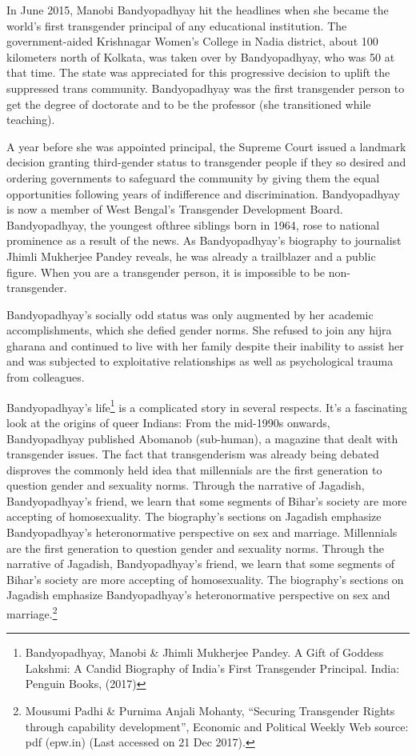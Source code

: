 \begin{multicols}{2}
\noi
In June 2015, Manobi Bandyopadhyay hit the headlines when she became the world's first
transgender principal of any educational institution. The government-aided Krishnagar
Women's College in Nadia district, about 100 kilometers north of Kolkata, was taken over by
Bandyopadhyay, who was 50 at that time. The state was appreciated for this progressive
decision to uplift the suppressed trans community. Bandyopadhyay was the first transgender
person to get the degree of doctorate and to be the professor (she transitioned while teaching).


\noi
A year before she was appointed principal, the Supreme Court issued a landmark decision
granting third-gender status to transgender people if they so desired and ordering governments
to safeguard the community by giving them the equal opportunities following years of
indifference and discrimination. Bandyopadhyay is now a member of West Bengal's
Transgender Development Board. Bandyopadhyay, the youngest ofthree siblings born in 1964,
rose to national prominence as a result of the news. As Bandyopadhyay's biography to
journalist Jhimli Mukherjee Pandey reveals, he was already a trailblazer and a public figure.
When you are a transgender person, it is impossible to be non-transgender.

\noi
Bandyopadhyay's socially odd status was only augmented by her academic accomplishments,
which she defied gender norms. She refused to join any hijra gharana and continued to live
with her family despite their inability to assist her and was subjected to exploitative
relationships as well as psychological trauma from colleagues.

\noi
Bandyopadhyay's life\footnote{Bandyopadhyay, Manobi \& Jhimli Mukherjee Pandey. A Gift of Goddess Lakshmi: A Candid Biography of India’s First Transgender Principal. India: Penguin Books, (2017)} is a complicated story in several respects. It's a fascinating look at the origins of queer Indians: From the mid-1990s onwards, Bandyopadhyay published Abomanob (sub-human), a magazine that dealt with transgender issues. The fact that transgenderism was already being debated disproves the commonly held idea that millennials are the first generation to question gender and sexuality norms. Through the narrative of Jagadish, Bandyopadhyay's friend, we learn that some segments of Bihar's society are more accepting of homosexuality. The biography's sections on Jagadish emphasize Bandyopadhyay's heteronormative perspective on sex and marriage. Millennials are the first generation to question gender and sexuality norms. Through the narrative of Jagadish, Bandyopadhyay's friend, we learn that some segments of Bihar's society are more accepting of homosexuality. The biography's sections on Jagadish emphasize Bandyopadhyay's heteronormative perspective on sex and marriage.\footnote{Mousumi Padhi \& Purnima Anjali Mohanty, “Securing Transgender Rights through capability development”, Economic and Political Weekly Web source: pdf (epw.in) (Last accessed on 21 Dec 2017).}


\end{multicols}
